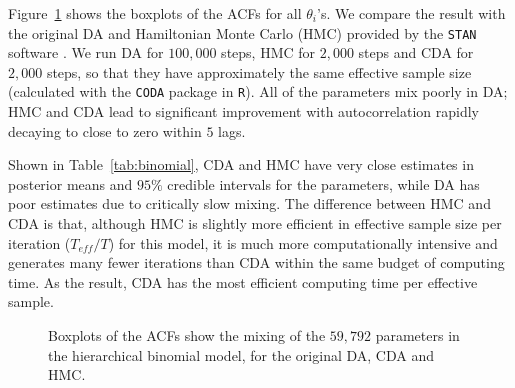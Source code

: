 \documentclass[11pt]{article}
\begin{document}
Figure~\ref{data_binomial} shows the boxplots of the ACFs for all $\theta_i$'s. We compare the result with the original DA \citep{polson2013bayesian} and Hamiltonian Monte Carlo (HMC) provided by the \texttt{STAN} software \citep{carpenter2016stan}. We run DA for $100,000$ steps, HMC for $2,000$ steps and CDA for $2,000$ steps, so that they have approximately the same effective sample size (calculated with the \texttt{CODA} package in \texttt{R}). All of the parameters mix poorly in DA; HMC and CDA lead to significant improvement with autocorrelation rapidly decaying to close to zero within $5$ lags.

Shown in Table~\ref{tab:binomial}, CDA and HMC have very close estimates in posterior means and $95\%$ credible intervals for the parameters, while DA has poor estimates due to critically slow mixing. The difference between HMC and CDA is that, although HMC is slightly more efficient in effective sample size per iteration ($T_{eff}/T$) for this model, it is much more computationally intensive and generates many fewer iterations than CDA within the same budget of computing time. As the result, CDA has the most efficient computing time per effective sample.  

 
\begin{figure}[H]
  {\caption{Boxplots of the ACFs show the mixing of the $59,792$ parameters in the hierarchical binomial model, for the original DA\citep{polson2013bayesian}, CDA and HMC. \label{data_binomial}}}
  {%
    \qquad
     \qquad
  }
\end{figure}
 
\end{document}
